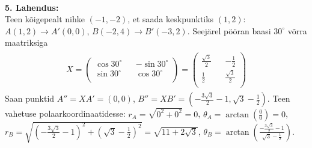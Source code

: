 \documentclass{article}
\begin{document}
\pagebreak\\
\textbf{5. Lahendus:}\\
Teen kõigepealt nihke $(-1,-2)$, et saada keskpunktiks $(1,2)$: $A(1,2)\rightarrow A'(0,0)$, $B(-2,4)\rightarrow B'(-3,2)$. Seejärel pööran baasi $30^\circ$ võrra maatriksiga 
\begin{gather*}
\begin{aligned}
X=
\begin{pmatrix}
\cos 30^\circ && -\sin 30^\circ\\
\sin 30^\circ && \cos 30^\circ\\
\end{pmatrix}=
\begin{pmatrix}
\frac{\sqrt{3}}2 && -\frac12\\
\frac12 && \frac{\sqrt{3}}2\\
\end{pmatrix}
\end{aligned}
\end{gather*}
Saan punktid $A''=XA'=(0,0)$, $B''=XB'=\left(-\frac{3\sqrt{3}}{2}-1, \sqrt3-\frac12\right)$.
Teen vahetuse polaarkoordinaatidesse: $r_A=\sqrt{0^2+0^2}=0$, $\theta_A=\arctan\left(\frac{0}{0}\right)=0$, $r_B=\sqrt{\left(-\frac{3\sqrt{3}}{2}-1\right)^2+\left(\sqrt3-\frac12\right)^2}=\sqrt{11+2\sqrt{3}}$, $\theta_B=\arctan\left(\frac{-\frac{3\sqrt{3}}{2}-1}{\sqrt3-\frac12}\right)$.
\end{document}

